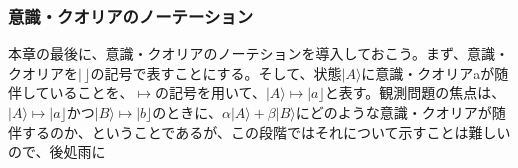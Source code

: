 \subsubsection{意識・クオリアのノーテーション}
本章の最後に、意識・クオリアのノーテションを導入しておこう。まず、意識・クオリアを$|\,\rfloor$の記号で表すことにする。そして、状態$|A\rangle$に意識・クオリアaが随伴していることを、$\mapsto$の記号を用いて、$|A\rangle \mapsto |a \rfloor$と表す。観測問題の焦点は、$|A\rangle \mapsto |a \rfloor$かつ$|B\rangle \mapsto |b \rfloor$のときに、$\alpha|A\rangle + \beta|B\rangle$にどのような意識・クオリアが随伴するのか、ということであるが、この段階ではそれについて示すことは難しいので、後処雨に
